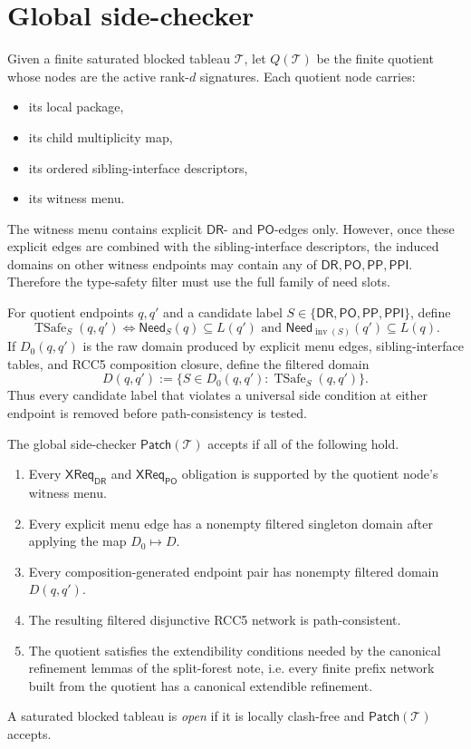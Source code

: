 \documentclass[11pt]{article}
\theoremstyle{remark}
\newcommand{\DR}{\mathsf{DR}}
\newcommand{\PO}{\mathsf{PO}}
\newcommand{\PP}{\mathsf{PP}}
\newcommand{\PPI}{\mathsf{PPI}}
\newcommand{\CrossDR}{\mathsf{XReq}_{\DR}}
\newcommand{\CrossPO}{\mathsf{XReq}_{\PO}}
\newcommand{\TSafe}{\operatorname{TSafe}}
\newcommand{\inv}{\operatorname{inv}}
\begin{document}
\section{Global side-checker}\label{sec:global-check}

Given a finite saturated blocked tableau $\mathcal T$, let $Q(\mathcal T)$ be the finite quotient whose nodes are the active rank-$d$ signatures. Each quotient node carries:
\begin{itemize}
    \item its local package,
    \item its child multiplicity map,
    \item its ordered sibling-interface descriptors,
    \item its witness menu.
\end{itemize}
The witness menu contains explicit $\DR$- and $\PO$-edges only. However, once these explicit edges are combined with the sibling-interface descriptors, the induced domains on other witness endpoints may contain any of $\DR,\PO,\PP,\PPI$. Therefore the type-safety filter must use the full family of need slots.

For quotient endpoints $q,q'$ and a candidate label $S\in\{\DR,\PO,\PP,\PPI\}$, define
\[
\TSafe_S(q,q')\iff \mathsf{Need}_{S}(q)\subseteq L(q')\text{ and }\mathsf{Need}_{\inv(S)}(q')\subseteq L(q).
\]
If $D_0(q,q')$ is the raw domain produced by explicit menu edges, sibling-interface tables, and RCC5 composition closure, define the filtered domain
\[
D(q,q'):=\{S\in D_0(q,q') : \TSafe_S(q,q')\}.
\]
Thus every candidate label that violates a universal side condition at either endpoint is removed before path-consistency is tested.

The global side-checker $\mathsf{Patch}(\mathcal T)$ accepts if all of the following hold.
\begin{enumerate}[label=(\roman*)]
    \item Every $\CrossDR$ and $\CrossPO$ obligation is supported by the quotient node's witness menu.
    \item Every explicit menu edge has a nonempty filtered singleton domain after applying the map $D_0\mapsto D$.
    \item Every composition-generated endpoint pair has nonempty filtered domain $D(q,q')$.
    \item The resulting filtered disjunctive RCC5 network is path-consistent.
    \item The quotient satisfies the extendibility conditions needed by the canonical refinement lemmas of the split-forest note, i.e. every finite prefix network built from the quotient has a canonical extendible refinement.
\end{enumerate}
A saturated blocked tableau is \emph{open} if it is locally clash-free and $\mathsf{Patch}(\mathcal T)$ accepts.
\end{document}
